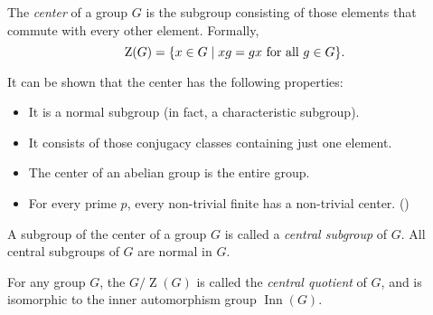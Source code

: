 \documentclass{article}
\DeclareMathOperator{\Inn}{Inn}
\begin{document}

The \emph{center} of a group $G$ is the subgroup consisting of those elements that commute with every other element. Formally,
$$\operatorname{Z}(G) = \{x \in G \mid xg = gx\hbox{ for all }g \in G\}.$$

It can be shown that the center has the following properties:
\begin{itemize}
\item It is a normal subgroup (in fact, a characteristic subgroup).
\item It consists of those conjugacy classes containing just one element.
\item The center of an abelian group is the entire group.
\item For every prime $p$, every non-trivial finite  has a non-trivial center.
()
\end{itemize}

A subgroup of the center of a group $G$
is called a \emph{central subgroup} of $G$.
All central subgroups of $G$ are normal in $G$.

For any group $G$, the  $G/\operatorname{Z}(G)$ is called the \emph{central quotient} of $G$,
and is isomorphic to the inner automorphism group $\Inn(G)$.
\end{document}
